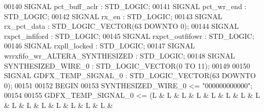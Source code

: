 \begin{DoxyCode}
00140 \textcolor{keywordflow}{SIGNAL}  \textcolor{vhdlchar}{pct_buff_aclr} \textcolor{vhdlchar}{:}  \textcolor{comment}{STD\_LOGIC};
00141 \textcolor{keywordflow}{SIGNAL}  \textcolor{vhdlchar}{pct_wr_end} \textcolor{vhdlchar}{:}  \textcolor{comment}{STD\_LOGIC};
00142 \textcolor{keywordflow}{SIGNAL}  \textcolor{vhdlchar}{rx_en} \textcolor{vhdlchar}{:}  \textcolor{comment}{STD\_LOGIC};
00143 \textcolor{keywordflow}{SIGNAL}  \textcolor{vhdlchar}{rx_pct_data} \textcolor{vhdlchar}{:}  \textcolor{comment}{STD\_LOGIC\_VECTOR}\textcolor{vhdlchar}{(}\textcolor{vhdllogic}{}\textcolor{vhdllogic}{63} \textcolor{keywordflow}{DOWNTO} \textcolor{vhdllogic}{}\textcolor{vhdllogic}{0}\textcolor{vhdlchar}{)};
00144 \textcolor{keywordflow}{SIGNAL}  \textcolor{vhdlchar}{rxpct_infiford} \textcolor{vhdlchar}{:}  \textcolor{comment}{STD\_LOGIC};
00145 \textcolor{keywordflow}{SIGNAL}  \textcolor{vhdlchar}{rxpct_outfifowr} \textcolor{vhdlchar}{:}  \textcolor{comment}{STD\_LOGIC};
00146 \textcolor{keywordflow}{SIGNAL}  \textcolor{vhdlchar}{rxpll_locked} \textcolor{vhdlchar}{:}  \textcolor{comment}{STD\_LOGIC};
00147 \textcolor{keywordflow}{SIGNAL}  \textcolor{vhdlchar}{wrrxfifo_wr_ALTERA_SYNTHESIZED} \textcolor{vhdlchar}{:}  \textcolor{comment}{STD\_LOGIC};
00148 \textcolor{keywordflow}{SIGNAL}  \textcolor{vhdlchar}{SYNTHESIZED_WIRE_0} \textcolor{vhdlchar}{:}  \textcolor{comment}{STD\_LOGIC\_VECTOR}\textcolor{vhdlchar}{(}\textcolor{vhdllogic}{}\textcolor{vhdllogic}{0} \textcolor{keywordflow}{TO} \textcolor{vhdllogic}{}\textcolor{vhdllogic}{11}\textcolor{vhdlchar}{)};
00149 
00150 \textcolor{keywordflow}{SIGNAL}  \textcolor{vhdlchar}{GDFX_TEMP_SIGNAL_0} \textcolor{vhdlchar}{:}  \textcolor{comment}{STD\_LOGIC\_VECTOR}\textcolor{vhdlchar}{(}\textcolor{vhdllogic}{}\textcolor{vhdllogic}{63} \textcolor{keywordflow}{DOWNTO} \textcolor{vhdllogic}{}\textcolor{vhdllogic}{0}\textcolor{vhdlchar}{)};
00151 
00152 \textcolor{vhdlkeyword}{BEGIN }
00153 \textcolor{vhdlchar}{SYNTHESIZED_WIRE_0} \textcolor{vhdlchar}{<=} \textcolor{vhdllogic}{"000000000000"};
00154 
00155 \textcolor{vhdlchar}{GDFX_TEMP_SIGNAL_0} \textcolor{vhdlchar}{<=} \textcolor{vhdlchar}{(}\textcolor{vhdlchar}{L} \textcolor{vhdlchar}{&} \textcolor{vhdlchar}{L} \textcolor{vhdlchar}{&} \textcolor{vhdlchar}{L} \textcolor{vhdlchar}{&} \textcolor{vhdlchar}{L} \textcolor{vhdlchar}{&} \textcolor{vhdlchar}{L} \textcolor{vhdlchar}{&} \textcolor{vhdlchar}{L} \textcolor{vhdlchar}{&} \textcolor{vhdlchar}{L} \textcolor{vhdlchar}{&} \textcolor{vhdlchar}{L} \textcolor{vhdlchar}{&} \textcolor{vhdlchar}{L} \textcolor{vhdlchar}{&} \textcolor{vhdlchar}{L} \textcolor{vhdlchar}{&} \textcolor{vhdlchar}{L} \textcolor{vhdlchar}{&} \textcolor{vhdlchar}{L} \textcolor{vhdlchar}{&} \textcolor{vhdlchar}{L} \textcolor{vhdlchar}{&} \textcolor{vhdlchar}{L} \textcolor{vhdlchar}{&} \textcolor{vhdlchar}{L} \textcolor{vhdlchar}{&} \textcolor{vhdlchar}{
}
\end{DoxyCode}
